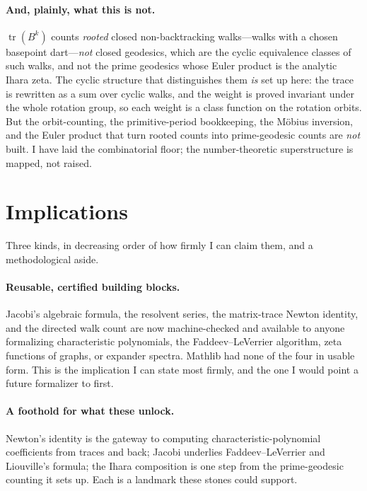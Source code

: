\documentclass[11pt]{article}
\newcommand{\tr}{\operatorname{tr}}
\begin{document}
\paragraph{And, plainly, what this is not.}
$\tr(B^k)$ counts \emph{rooted} closed non-backtracking walks---walks with a chosen basepoint
dart---\emph{not} closed geodesics, which are the cyclic equivalence classes of such walks, and not
the prime geodesics whose Euler product is the analytic Ihara zeta. The cyclic structure that
distinguishes them \emph{is} set up here: the trace is rewritten as a sum over cyclic walks, and the
weight is proved invariant under the whole rotation group, so each weight is a class function on the
rotation orbits. But the orbit-counting, the primitive-period bookkeeping, the M\"obius inversion,
and the Euler product that turn rooted counts into prime-geodesic counts are \emph{not} built. I have
laid the combinatorial floor; the number-theoretic superstructure is mapped, not raised.

\section{Implications}
\label{sec:implications}

Three kinds, in decreasing order of how firmly I can claim them, and a methodological aside.

\paragraph{Reusable, certified building blocks.}
Jacobi's algebraic formula, the resolvent series, the matrix-trace Newton identity, and the directed
walk count are now machine-checked and available to anyone formalizing characteristic polynomials,
the Faddeev--LeVerrier algorithm, zeta functions of graphs, or expander spectra. Mathlib had none of
the four in usable form. This is the implication I can state most firmly, and the one I would point a
future formalizer to first.

\paragraph{A foothold for what these unlock.}
Newton's identity is the gateway to computing characteristic-polynomial coefficients from traces and
back; Jacobi underlies Faddeev--LeVerrier and Liouville's formula; the Ihara composition is one step
from the prime-geodesic counting it sets up. Each is a landmark these stones could support.
\end{document}
